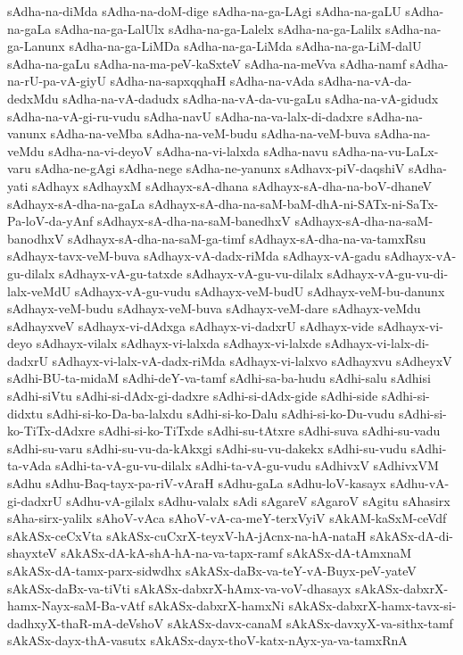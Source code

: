{sAdha-na-diMda
sAdha-na-doM-dige
sAdha-na-ga-LAgi
sAdha-na-gaLU
sAdha-na-gaLa
sAdha-na-ga-LalUlx
sAdha-na-ga-Lalelx
sAdha-na-ga-Lalilx
sAdha-na-ga-Lanunx
sAdha-na-ga-LiMDa
sAdha-na-ga-LiMda
sAdha-na-ga-LiM-dalU
sAdha-na-gaLu
sAdha-na-ma-peV-kaSxteV
sAdha-na-meVva
sAdha-namf
sAdha-na-rU-pa-vA-giyU
sAdha-na-sapxqqhaH
sAdha-na-vAda
sAdha-na-vA-da-dedxMdu
sAdha-na-vA-dadudx
sAdha-na-vA-da-vu-gaLu
sAdha-na-vA-gidudx
sAdha-na-vA-gi-ru-vudu
sAdha-navU
sAdha-na-va-lalx-di-dadxre
sAdha-na-vanunx
sAdha-na-veMba
sAdha-na-veM-budu
sAdha-na-veM-buva
sAdha-na-veMdu
sAdha-na-vi-deyoV
sAdha-na-vi-lalxda
sAdha-navu
sAdha-na-vu-LaLx-varu
sAdha-ne-gAgi
sAdha-nege
sAdha-ne-yanunx
sAdhavx-piV-daqshiV
sAdha-yati
sAdhayx
sAdhayxM
sAdhayx-sA-dhana
sAdhayx-sA-dha-na-boV-dhaneV
sAdhayx-sA-dha-na-gaLa
sAdhayx-sA-dha-na-saM-baM-dhA-ni-SATx-ni-SaTx-Pa-loV-da-yAnf
sAdhayx-sA-dha-na-saM-banedhxV
sAdhayx-sA-dha-na-saM-banodhxV
sAdhayx-sA-dha-na-saM-ga-timf
sAdhayx-sA-dha-na-va-tamxRsu
sAdhayx-tavx-veM-buva
sAdhayx-vA-dadx-riMda
sAdhayx-vA-gadu
sAdhayx-vA-gu-dilalx
sAdhayx-vA-gu-tatxde
sAdhayx-vA-gu-vu-dilalx
sAdhayx-vA-gu-vu-di-lalx-veMdU
sAdhayx-vA-gu-vudu
sAdhayx-veM-budU
sAdhayx-veM-bu-danunx
sAdhayx-veM-budu
sAdhayx-veM-buva
sAdhayx-veM-dare
sAdhayx-veMdu
sAdhayxveV
sAdhayx-vi-dAdxga
sAdhayx-vi-dadxrU
sAdhayx-vide
sAdhayx-vi-deyo
sAdhayx-vilalx
sAdhayx-vi-lalxda
sAdhayx-vi-lalxde
sAdhayx-vi-lalx-di-dadxrU
sAdhayx-vi-lalx-vA-dadx-riMda
sAdhayx-vi-lalxvo
sAdhayxvu
sAdheyxV
sAdhi-BU-ta-midaM
sAdhi-deY-va-tamf
sAdhi-sa-ba-hudu
sAdhi-salu
sAdhisi
sAdhi-siVtu
sAdhi-si-dAdx-gi-dadxre
sAdhi-si-dAdx-gide
sAdhi-side
sAdhi-si-didxtu
sAdhi-si-ko-Da-ba-lalxdu
sAdhi-si-ko-Dalu
sAdhi-si-ko-Du-vudu
sAdhi-si-ko-TiTx-dAdxre
sAdhi-si-ko-TiTxde
sAdhi-su-tAtxre
sAdhi-suva
sAdhi-su-vadu
sAdhi-su-varu
sAdhi-su-vu-da-kAkxgi
sAdhi-su-vu-dakekx
sAdhi-su-vudu
sAdhi-ta-vAda
sAdhi-ta-vA-gu-vu-dilalx
sAdhi-ta-vA-gu-vudu
sAdhivxV
sAdhivxVM
sAdhu
sAdhu-Baq-tayx-pa-riV-vAraH
sAdhu-gaLa
sAdhu-loV-kasayx
sAdhu-vA-gi-dadxrU
sAdhu-vA-gilalx
sAdhu-valalx
sAdi
sAgareV
sAgaroV
sAgitu
sAhasirx
sAha-sirx-yalilx
sAhoV-vAca
sAhoV-vA-ca-meY-terxVyiV
sAkAM-kaSxM-ceVdf
sAkASx-ceCxVta
sAkASx-cuCxrX-teyxV-hA-jAcnx-na-hA-nataH
sAkASx-dA-di-shayxteV
sAkASx-dA-kA-shA-hA-na-va-tapx-ramf
sAkASx-dA-tAmxnaM
sAkASx-dA-tamx-parx-sidwdhx
sAkASx-daBx-va-teY-vA-Buyx-peV-yateV
sAkASx-daBx-va-tiVti
sAkASx-dabxrX-hAmx-va-voV-dhasayx
sAkASx-dabxrX-hamx-Nayx-saM-Ba-vAtf
sAkASx-dabxrX-hamxNi
sAkASx-dabxrX-hamx-tavx-si-dadhxyX-thaR-mA-deVshoV
sAkASx-davx-canaM
sAkASx-davxyX-va-sithx-tamf
sAkASx-dayx-thA-vasutx
sAkASx-dayx-thoV-katx-nAyx-ya-va-tamxRnA
}
